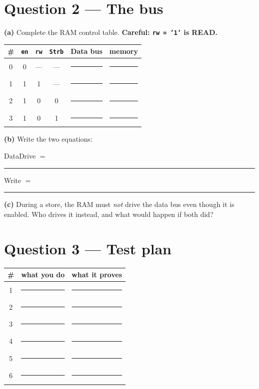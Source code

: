 \documentclass[11pt]{article}
\newcommand{\code}[1]{\texttt{#1}}
\newcommand{\answerbox}[1]{\vspace{2pt}\fbox{\parbox[c][#1][c]{\dimexpr\linewidth-2\fboxsep-2\fboxrule}{\ }}\vspace{4pt}}
\begin{document}
\answerbox{1.4cm}

\section*{Question 2 --- The bus}

\textbf{(a)} Complete the RAM control table. \textbf{Careful: \code{rw = '1'} is
READ.}

\begin{center}
\begin{tabular}{cccc@{\hskip 8pt}||@{\hskip 8pt}l@{\hskip 14pt}l}
\toprule
\# & \code{en} & \code{rw} & \code{Strb} & Data bus & memory \\
\midrule
0 & 0 & --- & --- & \rule{2.6cm}{0.4pt} & \rule{3.4cm}{0.4pt} \\[5pt]
1 & 1 & 1 & --- & \rule{2.6cm}{0.4pt} & \rule{3.4cm}{0.4pt} \\[5pt]
2 & 1 & 0 & 0 & \rule{2.6cm}{0.4pt} & \rule{3.4cm}{0.4pt} \\[5pt]
3 & 1 & 0 & 1 & \rule{2.6cm}{0.4pt} & \rule{3.4cm}{0.4pt} \\
\bottomrule
\end{tabular}
\end{center}

\textbf{(b)} Write the two equations:

\vspace{4pt}
DataDrive $=$ \rule{6cm}{0.4pt} \hfill Write $=$ \rule{6cm}{0.4pt}
\vspace{8pt}

\textbf{(c)} During a store, the RAM must \emph{not} drive the data bus even
though it is enabled. Who drives it instead, and what would happen if both did?

\answerbox{2.0cm}

\section*{Question 3 --- Test plan}

\begin{center}
\begin{tabular}{@{}c@{\hskip 8pt}p{5.0cm}@{\hskip 8pt}p{7.6cm}@{}}
\toprule
\# & what you do & what it proves \\
\midrule
1 & \rule{4.8cm}{0.4pt} & \rule{7.4cm}{0.4pt} \\[8pt]
2 & \rule{4.8cm}{0.4pt} & \rule{7.4cm}{0.4pt} \\[8pt]
3 & \rule{4.8cm}{0.4pt} & \rule{7.4cm}{0.4pt} \\[8pt]
4 & \rule{4.8cm}{0.4pt} & \rule{7.4cm}{0.4pt} \\[8pt]
5 & \rule{4.8cm}{0.4pt} & \rule{7.4cm}{0.4pt} \\[8pt]
6 & \rule{4.8cm}{0.4pt} & \rule{7.4cm}{0.4pt} \\
\bottomrule
\end{tabular}
\end{center}
\end{document}
